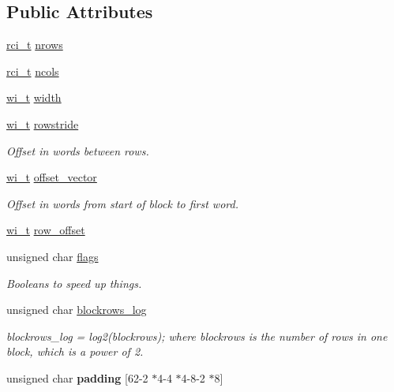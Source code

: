 \subsection*{Public Attributes}
\begin{DoxyCompactItemize}
\item 
\hyperlink{misc_8h_a03971b7935a6bc6fb77e74988850a136}{rci\+\_\+t} \hyperlink{structmzd__t_a23d9c4b4c77bddce183fde327256f3ff}{nrows}
\item 
\hyperlink{misc_8h_a03971b7935a6bc6fb77e74988850a136}{rci\+\_\+t} \hyperlink{structmzd__t_aff453b90ed1f50baf4454e70c3f1d19e}{ncols}
\item 
\hyperlink{misc_8h_ab3e1df9eeef59797b83f1a79851ead7e}{wi\+\_\+t} \hyperlink{structmzd__t_a0e2ffa9253cfa52b2ee3d88a95be00a5}{width}
\item 
\hyperlink{misc_8h_ab3e1df9eeef59797b83f1a79851ead7e}{wi\+\_\+t} \hyperlink{structmzd__t_a0ce300dfa1c7802b69c96cf32105f322}{rowstride}
\begin{DoxyCompactList}\small\item\em Offset in words between rows. \end{DoxyCompactList}\item 
\hyperlink{misc_8h_ab3e1df9eeef59797b83f1a79851ead7e}{wi\+\_\+t} \hyperlink{structmzd__t_ad4d16d8c1fc19e3b872fa7c87acd7554}{offset\+\_\+vector}
\begin{DoxyCompactList}\small\item\em Offset in words from start of block to first word. \end{DoxyCompactList}\item 
\hyperlink{misc_8h_ab3e1df9eeef59797b83f1a79851ead7e}{wi\+\_\+t} \hyperlink{structmzd__t_a1d95aca572cb27799972ceb308ea219f}{row\+\_\+offset}
\item 
unsigned char \hyperlink{structmzd__t_a71bc6ea4f80c3afdf430a416074459f0}{flags}
\begin{DoxyCompactList}\small\item\em Booleans to speed up things. \end{DoxyCompactList}\item 
\hypertarget{structmzd__t_ab566bfb0b6e19dfc60a2ae644fca70d5}{}unsigned char \hyperlink{structmzd__t_ab566bfb0b6e19dfc60a2ae644fca70d5}{blockrows\+\_\+log}\label{structmzd__t_ab566bfb0b6e19dfc60a2ae644fca70d5}

\begin{DoxyCompactList}\small\item\em blockrows\+\_\+log = log2(blockrows); where blockrows is the number of rows in one block, which is a power of 2. \end{DoxyCompactList}\item 
\hypertarget{structmzd__t_a5448cb4a028c6f3f8dbbacd37d5437e3}{}unsigned char {\bfseries padding} \mbox{[}62-\/2 $\ast$4-\/4 $\ast$4-\/8-\/2 $\ast$8\mbox{]}\label{structmzd__t_a5448cb4a028c6f3f8dbbacd37d5437e3}


\end{DoxyCompactItemize}
